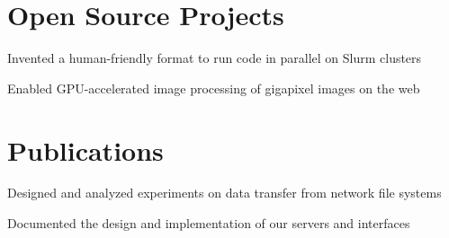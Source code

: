\documentclass[]{deedy-resume-openfont}
\begin{document}
\begin{minipage}[t]{0.66\textwidth}
\section{Open Source Projects}
\begin{tightemize}
\item Invented a human-friendly format to run code in parallel on Slurm clusters
\end{tightemize}
\sectionsep
{}
\begin{tightemize}
\item Enabled GPU-accelerated image processing of gigapixel images on the web
\end{tightemize}
\sectionsep


\section{Publications}
\begin{tightemize}
\item Designed and analyzed experiments on data transfer  from network file systems
\item Documented the design and implementation of our servers and interfaces
\end{tightemize}
\sectionsep
\end{minipage} 
\end{document}
